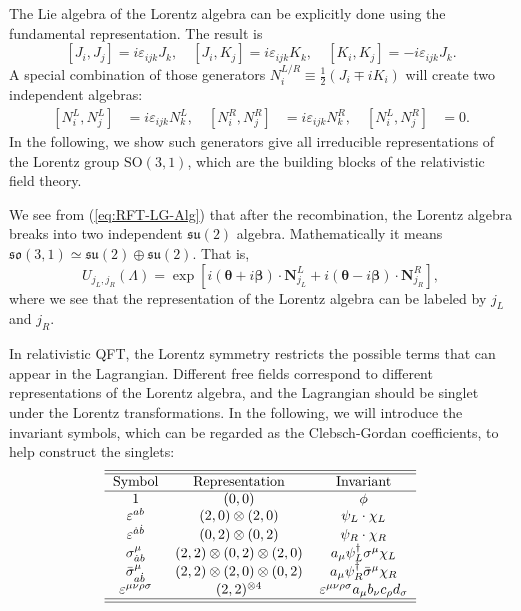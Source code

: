 \documentclass[aps,prb,superscriptaddress,nofootinbib]{revtex4}
\begin{document}
The Lie algebra of the Lorentz algebra can be explicitly done using the fundamental representation. 
The result is
\begin{equation}
	\left[J_i, J_j\right] = i \varepsilon_{ijk} J_k, \quad
	\left[J_i, K_j\right] = i \varepsilon_{ijk} K_k, \quad
	\left[K_i, K_j\right] = -i\varepsilon_{ijk} J_k.
\end{equation}
A special combination of those generators $N_i^{L/R} \equiv \frac{1}{2}(J_i \mp i K_i)$ will create two independent algebras:
\begin{equation}\label{eq:RFT-LG-Alg}
\begin{aligned}
	\left[N_i^L, N_j^L \right] &= i\varepsilon_{ijk}N_k^L, \quad
	\left[N_i^R, N_j^R \right] &= i\varepsilon_{ijk}N_k^R, \quad
	\left[N_i^L, N_j^R \right] &= 0.
\end{aligned}
\end{equation}
In the following, we show such generators give all irreducible representations of the Lorentz group $\mathrm{SO}(3,1)$, which are the building blocks of the relativistic field theory.




We see from (\ref{eq:RFT-LG-Alg}) that after the recombination, the Lorentz algebra breaks into two independent $\mathfrak{su}(2)$ algebra.
Mathematically it means $\mathfrak{so}(3,1) \simeq \mathfrak{su}(2) \oplus \mathfrak{su}(2)$.
That is,
\begin{equation}
	U_{j_L,j_R}(\Lambda)
	= \exp\left[i(\bm\theta+i\bm\beta)\cdot \bm N^L_{j_L} + i(\bm\theta-i\bm\beta)\cdot \bm N^R_{j_R}\right],
\end{equation}
where we see that the representation of the Lorentz algebra can be labeled by $j_L$ and $ j_R$.

In relativistic QFT, the Lorentz symmetry restricts the possible terms that can appear in the Lagrangian.
Different free fields correspond to different representations of the Lorentz algebra, and the Lagrangian should be singlet under the Lorentz transformations.
In the following, we will introduce the invariant symbols, which can be regarded as the Clebsch-Gordan coefficients, to help construct the singlets: 
\begin{equation*}
\begin{tabular}{ccc}
	\hline \hline 
	Symbol & Representation  & Invariant \\ \hline
	$1$ & $(0,0)$ & $\phi$\\
	$\varepsilon^{ab}$ & $(2,0)\otimes (2,0)$ & $\psi_L \cdot \chi_L$ \\
	$\varepsilon^{\dot a \dot b}$ & $(0,2)\otimes (0,2)$ & $\psi_R \cdot \chi_R$ \\
	$\sigma^\mu_{\dot ab}$ & $(2,2)\otimes (0,2)\otimes(2,0)$ & $a_\mu \psi_L^\dagger \sigma^\mu \chi_L$ \\
	$\bar \sigma^\mu_{a \dot b}$ & $(2,2)\otimes (2,0)\otimes(0,2)$ & $a_\mu \psi_R^\dagger \bar\sigma^\mu \chi_R$ \\
	$\varepsilon^{\mu\nu\rho\sigma}$ & $(2,2)^{\otimes 4}$ & $\varepsilon^{\mu\nu\rho\sigma}a_\mu b_\nu c_\rho d_\sigma$ \\
	\hline \hline
\end{tabular}
\end{equation*}
\end{document}
